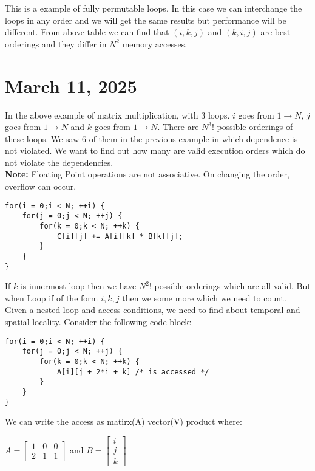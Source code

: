 \documentclass{article}
\begin{document}
This is a example of fully permutable loops. In this case we can interchange the loops in any order and we will get the same results but performance will be different. From above table we can find that $(i,k,j)$ and $(k,i,j)$ are best orderings and they differ in $N^2$ memory accesses. \\

\section*{March 11, 2025}
In the above example of matrix multiplication, with 3 loops. $i$ goes from $1 \rightarrow N$, $j$ goes from $1 \rightarrow N$ and $k$ goes from $1 \rightarrow N$. There are $N^3 ! $ possible orderings of these loops. We saw 6 of them in the previous example in which dependence is not violated. We want to find out how many are valid execution orders which do not violate the dependencies. \\

\textbf{Note:} Floating Point operations are not associative. On changing the order, overflow can occur. \\

\begin{lstlisting}
for(i = 0;i < N; ++i) {
    for(j = 0;j < N; ++j) {
        for(k = 0;k < N; ++k) {
            C[i][j] += A[i][k] * B[k][j];
        }
    }
}
\end{lstlisting}
If $k$ is innermost loop then we have $N^2!$ possible orderings which are all valid. But when Loop if of the form $i,k,j$ then we some more which we need to count. \\ 

Given a nested loop and access conditions, we need to find about temporal and spatial locality. Consider the following code block:
\begin{lstlisting}
for(i = 0;i < N; ++i) {
    for(j = 0;j < N; ++j) {
        for(k = 0;k < N; ++k) {
            A[i][j + 2*i + k] /* is accessed */
        }
    }
}
\end{lstlisting}

We can write the access as matirx(A) vector(V) product where:

$A = \begin{bmatrix}
    1 & 0 & 0 \\
    2 & 1 & 1 
\end{bmatrix}$ and 
$B = \begin{bmatrix}
    i \\ j \\ k
\end{bmatrix}$
\end{document}
